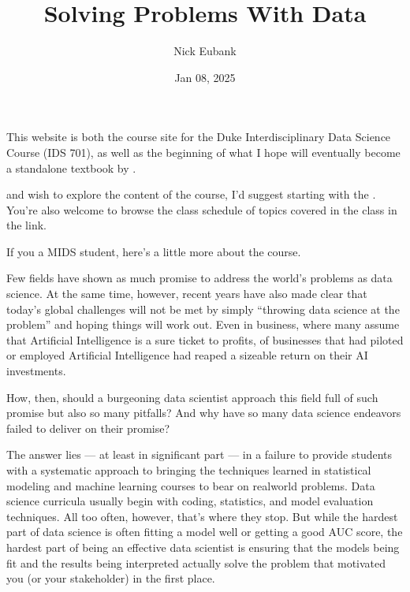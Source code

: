 \documentclass[letterpaper,10pt,english]{jupyterBook}
\title{Solving Problems With Data}
\date{Jan 08, 2025}
\author{Nick Eubank}
\begin{document}
\pagestyle{empty}
\sphinxmaketitle
\pagestyle{plain}
\sphinxtableofcontents
\pagestyle{normal}
\label{\detokenize{landing_page::doc}}


\sphinxAtStartPar
This website is both the course site for the Duke Interdisciplinary Data Science Course  (IDS 701), as well as the beginning of what I hope will eventually become a stand\sphinxhyphen{}alone textbook by .

\sphinxAtStartPar
{} and wish to explore the content of the course, I’d suggest starting with the {\hyperref[\detokenize{10_introduction/10_solving_problems_with_data::doc}]{}}. You’re also welcome to browse the class schedule of topics covered in the class in the {\hyperref[\detokenize{00_class_schedule/class_schedule::doc}]{}} link.

\sphinxAtStartPar
If you  a MIDS student, here’s a little more about the course.

\begin{DUlineblock}{0em}
\item[] 
\end{DUlineblock}

\sphinxAtStartPar
Few fields have shown as much promise to address the world’s problems as data science. At the same time, however, recent years have also made clear that today’s global challenges will not be met by simply “throwing data science at the problem” and hoping things will work out. Even in business, where many assume that Artificial Intelligence is a sure ticket to profits,  of businesses that had piloted or employed Artificial Intelligence had reaped a sizeable return on their AI investments.

\sphinxAtStartPar
How, then, should a burgeoning data scientist approach this field full of such promise but also so many pitfalls? And why have so many data science endeavors failed to deliver on their promise?

\sphinxAtStartPar
The answer lies — at least in significant part — in a failure to provide students with a systematic approach to bringing the techniques learned in statistical modeling and machine learning courses to bear on real\sphinxhyphen{}world problems. Data science curricula usually begin with coding, statistics, and model evaluation techniques. All too often, however, that’s where they stop. But while the hardest part of data science  is often fitting a model well or getting a good AUC score, the hardest part of being an effective  data scientist is ensuring that the models being fit and the results being interpreted actually solve the problem that motivated you (or your stakeholder) in the first place.
\end{document}
